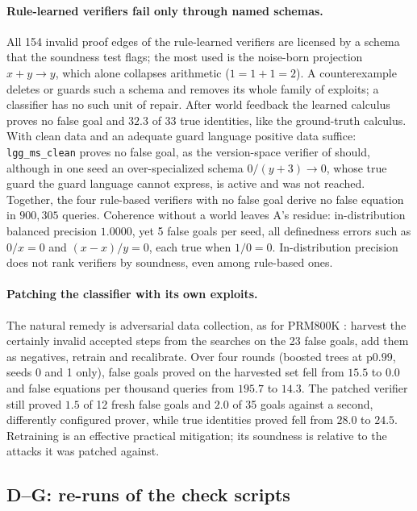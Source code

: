 \paragraph{Rule-learned verifiers fail only through named schemas.} All 154 invalid proof edges of the rule-learned verifiers are licensed by a schema that the soundness test flags; the most used is the noise-born projection $x+y\to y$, which alone collapses arithmetic ($1=1+1=2$). A counterexample deletes or guards such a schema and removes its whole family of exploits; a classifier has no such unit of repair. After world feedback the learned calculus proves no false goal and $32.3$ of 33 true identities, like the ground-truth calculus. With clean data and an adequate guard language positive data suffice: \texttt{lgg\_ms\_clean} proves no false goal, as the version-space verifier of  should, although in one seed an over-specialized schema $0/(y+3)\to0$, whose true guard the guard language cannot express, is active and was not reached. Together, the four rule-based verifiers with no false goal derive no false equation in $900{,}305$ queries. Coherence without a world leaves A's residue: in-distribution balanced precision $1.0000$, yet 5 false goals per seed, all definedness errors such as $0/x=0$ and $(x-x)/y=0$, each true when $1/0=0$. In-distribution precision does not rank verifiers by soundness, even among rule-based ones.

\paragraph{Patching the classifier with its own exploits.} The natural remedy is adversarial data collection, as for PRM800K \citep{lightman2023verify}: harvest the certainly invalid accepted steps from the searches on the 23 false goals, add them as negatives, retrain and recalibrate. Over four rounds (boosted trees at $\mathrm p0.99$, seeds 0 and 1 only), false goals proved on the harvested set fell from $15.5$ to $0.0$ and false equations per thousand queries from $195.7$ to $14.3$. The patched verifier still proved $1.5$ of 12 fresh false goals and $2.0$ of 35 goals against a second, differently configured prover, while true identities proved fell from $28.0$ to $24.5$. Retraining is an effective practical mitigation; its soundness is relative to the attacks it was patched against.

\subsection{D--G: re-runs of the check scripts}\label{sec:experiments:checks}\label{sec:experiments:ttl}\label{sec:experiments:physics}\label{sec:experiments:simplicity}\label{sec:experiments:comprehension}\label{tab:experiments:simplicity}

